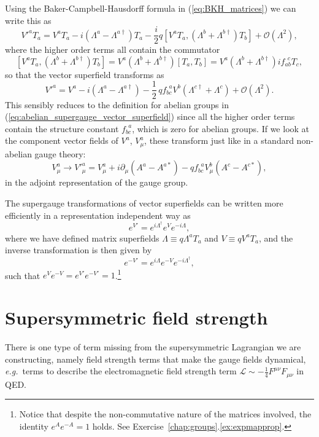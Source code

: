 \documentclass[notes.tex]{subfiles}
\begin{document}
Using the Baker-Campbell-Hausdorff formula in (\ref{eq:BKH_matrices}) we can write this as
\[V'^aT_a = V^aT_a - i(\Lambda^a-\Lambda^{a\dagger})T_a - \frac{i}{2}q[V^aT_a,(\Lambda^b + \Lambda^{b\dagger})T_b] +{\mathcal O}(\Lambda^2),\]
where the higher order terms all contain the commutator
\[ [V^aT_a,(\Lambda^b + \Lambda^{b\dagger})T_b] = V^a(\Lambda^b + \Lambda^{b\dagger}) [T_a,T_b]=  V^a(\Lambda^b + \Lambda^{b\dagger})if_{ab}^{~~c}T_c ,\]
so that the vector superfield transforms as 
\begin{equation}
V'^a = V^a - i(\Lambda^a-\Lambda^{a\dagger}) - \frac{1}{2}\,q f_{bc}^{~~a} V^b(\Lambda^{c\dagger} + \Lambda^c) +{\mathcal O}(\Lambda^2).
\label{eq:vector_superfield_nonabelian_supergauge_trans}
\end{equation}
This sensibly reduces to the definition for abelian groups in (\ref{eq:abelian_supergauge_vector_superfield}) since all the higher order terms contain the structure constant $f_{bc}^{~~a}$, which is zero for abelian groups. If we look at the component vector fields of $V^a$, $V^a_\mu$, these transform just like in a standard non-abelian  gauge theory:
\[V^a_\mu \to V'^a_\mu = V^a_\mu + i\partial_\mu(A^a - A^{a*}) - qf_{bc}^{~~a}V^b_\mu(A^c - A^{c*}),\]
in the adjoint representation of the gauge group.

The supergauge transformations of vector superfields can be written more efficiently in a representation independent way as
\[e^{V'} = e^{i\Lambda^\dagger}e^V e^{-i\Lambda},\]
where we have defined matrix superfields $\Lambda \equiv q \Lambda^aT_a$ and $V \equiv q V^aT_a$, and the inverse transformation is then given by
\[e^{-V'} = e^{i\Lambda}e^{-V} e^{-i\Lambda^\dagger},\]
such that $e^Ve^{-V} = e^{V'}e^{-V'} = 1$.\footnote{Notice that despite the non-commutative nature of the matrices involved, the identity $e^{A}e^{-A}=1$ holds. See Exercise~\ref{chap:groups}.\ref{ex:expmapprop}.}



\section{Supersymmetric field strength}
\label{sec:fieldstrength}
There is one type of term missing from the supersymmetric Lagrangian we are constructing, namely field strength terms that make the gauge fields dynamical, {\it e.g.}\ terms to describe the electromagnetic field strength term $\mathcal{L}\sim-\frac{1}{4}F^{\mu\nu}F_{\mu\nu}$ in QED.
\end{document}
